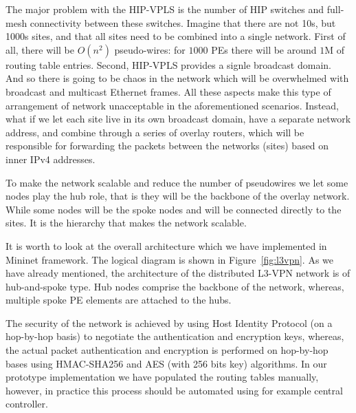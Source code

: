 The major problem with the HIP-VPLS is the number of HIP switches and
full-mesh connectivity between these switches. Imagine that there are 
not 10s, but 1000s sites, and that all sites need to be 
combined into a single network. First of all, there will be 
$O(n^2)$ pseudo-wires: for $1000$ PEs there will be  
around $1$M of routing table entries. Second, HIP-VPLS provides 
a signle broadcast domain. And so there is going to be 
chaos in the network which will be overwhelmed with broadcast
and multicast Ethernet frames. All these aspects make this type of
arrangement of network unacceptable in the aforementioned scenarios.
Instead, what if we let each site live in its own broadcast
domain, \ie have a separate network address, and combine through 
a series of overlay routers, which will be responsible for 
forwarding the packets between the networks (sites) based on 
inner IPv4 addresses. 

To make the network scalable and reduce the number of pseudowires
we let some nodes play the hub role, that is they will be the backbone 
of the overlay network. While some nodes will be the spoke nodes
and will be connected directly to the sites. It is the hierarchy 
that makes the network scalable. 

It is worth to look at the overall architecture which we have implemented in
Mininet framework. The logical diagram is shown in Figure~\ref{fig:l3vpn}. 
As we have already mentioned, the architecture of the distributed 
L3-VPN network is of hub-and-spoke type. Hub nodes comprise the backbone of the network, whereas,
multiple spoke PE elements are attached to the hubs. 

The security of the network is achieved by using Host Identity Protocol (on a hop-by-hop basis) to negotiate
the authentication and encryption keys, whereas, the actual packet authentication
and encryption is performed on hop-by-hop bases using HMAC-SHA256
and AES (with 256 bits key) algorithms. In our prototype implementation we 
have populated the routing tables manually, however, in practice this 
process should be automated using for example central controller. 

